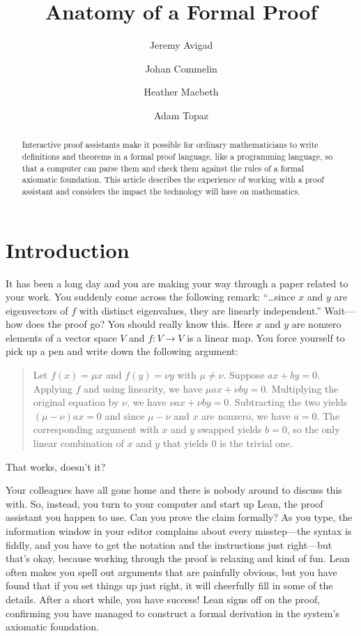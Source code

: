 \documentclass[11pt]{article}
\title{
	Anatomy of a Formal Proof
}
\author{
  Jeremy Avigad
  \affil{
	  Carnegie Mellon, USA. Professor. \texttt{avigad@cmu.edu}
    }
  \and
  Johan Commelin
  \affil{
	  Utrecht University, The Netherlands. Assistant Professor.
	  \texttt{j.m.commelin@uu.nl}
    }
  \and
  Heather Macbeth
  \affil{
	  Fordham University, USA. Assistant Professor.
	  \texttt{hmacbeth1@fordham.edu}
    }
  \and
  Adam Topaz
  \affil{
	  University of Alberta, Canada. Associate Professor.
	  \texttt{topaz@ualberta.ca}
    }
}
\begin{document}
\maketitle

\begin{abstract}
Interactive proof assistants make it possible for ordinary mathematicians to write definitions and theorems in a formal proof language, like a programming language, so that a computer can parse them and check them against the rules of a formal axiomatic foundation. This article describes the experience of working with a proof assistant and considers the impact the technology will have on mathematics.
\end{abstract}

\section*{Introduction}

It has been a long day and you are making your way through a paper related to your work. You suddenly come across the following remark: ``\ldots since $x$ and $y$ are eigenvectors of $f$ with distinct eigenvalues, they are linearly independent.'' Wait---how does the proof go? You should really know this. Here $x$ and $y$ are nonzero elements of a vector space $V$ and $f : V \to V$ is a linear map. You force yourself to pick up a pen and write down the following argument:
\begin{quote}
Let $f(x) = \mu x$ and $f(y) = \nu y$ with $\mu \ne \nu$. Suppose $a x + b y = 0$. Applying $f$ and using linearity, we have $\mu a x + \nu b y = 0$. Multiplying the original equation by $\nu$, we have $\nu a x + \nu b y = 0$. Subtracting the two yields $(\mu - \nu) a x = 0$ and since $\mu - \nu$ and $x$ are nonzero, we have $a = 0$. The corresponding argument with $x$ and $y$ swapped yields $b = 0$, so the only linear combination of $x$ and $y$ that yields $0$ is the trivial one.
\end{quote}
That works, doesn't it?

Your colleagues have all gone home and there is nobody around to discuss this with. So, instead, you turn to your computer and start up Lean, the proof assistant you happen to use. Can you prove the claim formally? As you type, the information window in your editor complains about every misstep---the syntax is fiddly, and you have to get the notation and the instructions just right---but that's okay, because working through the proof is relaxing and kind of fun. Lean often makes you spell out arguments that are painfully obvious, but you have found that if you set things up just right, it will cheerfully fill in some of the details. After a short while, you have success! Lean signs off on the proof, confirming you have managed to construct a formal derivation in the system's axiomatic foundation.
\end{document}
